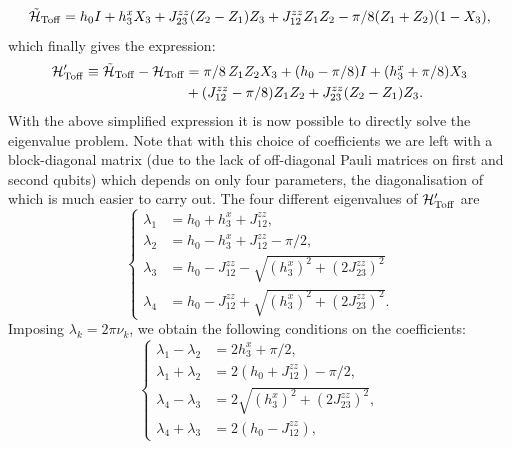 \begin{equation}
\begin{aligned}
    \tilde{{\mathcal{H}}}_{\operatorname{Toff}} = h_0 I + h_3^x X_3 + J_{23}^{zz}(Z_2 - Z_1)Z_3
    + J_{12}^{zz} Z_1 Z_2 - \pi/8 ( Z_1 +  Z_2)(1 - X_3),
\end{aligned}
\end{equation}
which finally gives the expression:
\begin{equation}
\begin{aligned}
	{\mathcal{H}}'_{\operatorname{Toff}}{}\equiv \tilde{{\mathcal{H}}}_{\operatorname{Toff}}-{\mathcal{H}}_{\operatorname{Toff}} &=
		\pi/8\, Z_1 Z_2 X_3 + (h_0 - \pi/8)I
		+ (h_3^x + \pi/8) X_3 \\
		&+ (J_{12}^{zz} - \pi/8) Z_1 Z_2 +
		J_{23}^{zz} (Z_2 - Z_1)Z_3.
\end{aligned}
\label{eq:GL:toffoli_HPrime_reduced}
\end{equation}
With the above simplified expression it is now possible to directly solve the eigenvalue problem. Note that with this choice of coefficients we are left with a block-diagonal matrix (due to the lack of off-diagonal Pauli matrices on first and second qubits) which depends on only four parameters, the diagonalisation of which is much easier to carry out.
The four different eigenvalues of ${\mathcal{H}}'_{\operatorname{Toff}}{}$ are
\begin{equation}
\begin{cases}
    \lambda_1 &= h_0 + h_3^x + J_{12}^{zz}, \\
    \lambda_2 &= h_0 - h_3^x + J_{12}^{zz} - \pi/2, \\
    \lambda_3 &= h_0 - J_{12}^{zz}
                - \sqrt{(h_3^x)^2+ (2J_{23}^{zz})^2}\\
    \lambda_4 &= h_0 - J_{12}^{zz}
                + \sqrt{(h_3^x)^2+ (2J_{23}^{zz})^2}.
\end{cases}
\end{equation}
Imposing $\lambda_k=2\pi\nu_k$, we obtain the following conditions on the coefficients:
\begin{equation}
\begin{cases}
    \lambda_1 - \lambda_2 &= 2 h_3^x + \pi/2, \\
    \lambda_1 + \lambda_2 &= 2(h_0 + J_{12}^{zz}) - \pi/2, \\
    \lambda_4 - \lambda_3 &= 2\sqrt{(h_3^x)^2+ (2J_{23}^{zz})^2}, \\
    \lambda_4 + \lambda_3 &= 2(h_0 - J_{12}^{zz}),
\end{cases}
\label{eq:GL:toffoli_lambdas_vs_parameters}
\end{equation}
